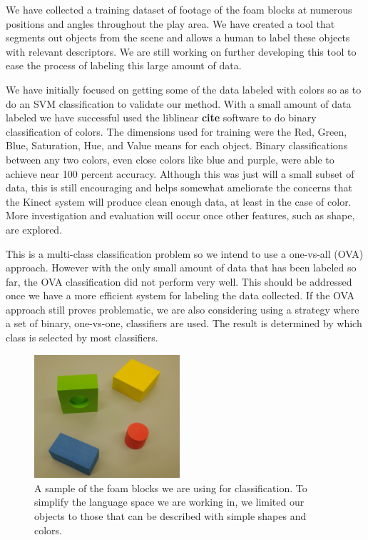 \documentclass[11pt]{article}
\newcommand{\xxx}[1]{{\bf \color{red} #1}}
\begin{document}
We have collected a training dataset of footage of the foam blocks at numerous
positions and angles throughout the play area. We have created a tool that
segments out objects from the scene and allows a human to label these objects
with relevant descriptors.  We are still working on further developing this
tool to ease the process of labeling this large amount of data.

We have initially focused on getting some of the data labeled with colors so as
to do an SVM classification to validate our method.  With a small amount of
data labeled we have successful used the liblinear \xxx{cite} software to do
binary classification of colors.  The dimensions used for training were the
Red, Green, Blue, Saturation, Hue, and Value means for each object.  Binary
classifications between any two colors, even close colors like blue and purple,
were able to achieve near 100 percent accuracy.  Although this was just will a
small subset of data, this is still encouraging and helps somewhat ameliorate
the concerns that the Kinect system will produce clean enough data, at least in
the case of color.  More investigation and evaluation will occur once other
features, such as shape, are explored.

This is a multi-class classification problem so we intend to use a one-vs-all
(OVA) approach.  However with the only small amount of data that has been
labeled so far, the OVA classification did not perform very well.  This should
be addressed once we have a more efficient system for labeling the data
collected.  If the OVA approach still proves problematic, we are also
considering using a strategy where a set of binary, one-vs-one, classifiers are
used.  The result is determined by which class is selected by most classifiers.


\begin{figure}
\centering
\includegraphics[width=0.48\textwidth]{figures/blocks.png}
\caption{A sample of the foam blocks we are using for classification. To
    simplify the language space we are working in, we limited our objects to
    those that can be described with simple shapes and colors.}
\label{fig:blocks}
\end{figure}
\end{document}
